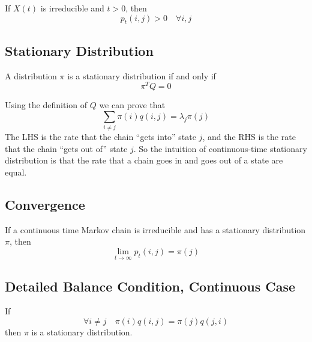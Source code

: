         \begin{lemma}\label{Lem:NecessaryConditionOfIrreducibility}
            If $X(t)$ is irreducible and $t>0$, then
            \[ p_t(i,j) > 0 \quad \forall i,j \]
        \end{lemma}

    \subsection{Stationary Distribution}
        \begin{lemma}\label{Lem:ContinuousTimeStationaryDistribution}
            A distribution $\pi$ is a stationary distribution if and only if
            \[ \pi^T Q = 0 \]
        \end{lemma}
        \begin{remark}
            Using the definition of $Q$ we can prove that
            \[ \sum_{i \neq j}\pi(i)q(i,j) = \lambda_j\pi(j) \]
            The LHS is the rate that the chain ``gets into'' state $j$, and the RHS is the rate that the chain ``gets out of'' state $j$. So the intuition of continuous-time stationary distribution is that the rate that a chain goes in and goes out of a state are equal.
        \end{remark}

    \subsection{Convergence}
        \begin{theorem}\label{Thm:ConvergenceOfCTMarkovChain}
            If a continuous time Markov chain is irreducible and has a stationary distribution $\pi$, then
            \[ \lim_{t\to\infty}p_t(i,j) = \pi(j) \]
        \end{theorem}

    \subsection{Detailed Balance Condition, Continuous Case}
        \begin{theorem}\label{Thm:DetailedBalanceConditionOfCTMarkovChain}
            If
            \[ \forall i \neq j \quad \pi(i)q(i,j) = \pi(j)q(j,i) \]
            then $\pi$ is a stationary distribution.
        \end{theorem}

